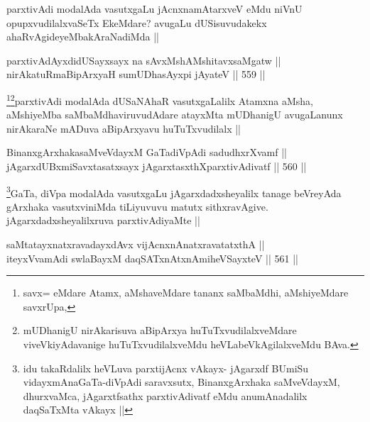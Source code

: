 \begin{artha}
parxtivAdi modalAda vasutxgaLu jAcnxnamAtarxveV eMdu niVnU opupxvudilalxvaSeTx EkeMdare? avugaLu dUSisuvudakekx ahaRvAgideyeMbakAraNadiMda ||
\end{artha}


\begin{shl}
parxtivAdAyxdidUSayxsayx na sAvxMshAMshitavxsaMgatw || \\
nirAkatuRmaBipArxyaH sumUDhasAyxpi jAyateV ||  559 ||  
\end{shl}

\begin{artha}
\footnote{savx= eMdare Atamx, aMshaveMdare tananx saMbaMdhi, aMshiyeMdare savxrUpa,}\footnote{mUDhanigU nirAkarisuva aBipArxya huTuTxvudilalxveMdare viveVkiyAdavanige huTuTxvudilalxveMdu heVLabeVkAgilalxveMdu BAva.}parxtivAdi modalAda dUSaNAhaR vasutxgaLalilx Atamxna aMsha, aMshiyeMba saMbaMdhaviruvudAdare atayxMta mUDhanigU avugaLanunx nirAkaraNe mADuva aBipArxyavu huTuTxvudilalx ||
\end{artha}


\begin{shl}
BinanxgArxhakasaMveVdayxM GaTadiVpAdi sadudhxrXvamf || \\
jAgarxdUBxmiSavxtasatxsayx jAgarxtasxthXparxtivAdivatf ||  560 ||  
\end{shl}

\begin{artha}
\footnote{idu takaRdalilx heVLuva parxtijAcnx vAkayx- jAgarxdf BUmiSu vidayxmAnaGaTa-diVpAdi saravxsutx, BinanxgArxhaka saMveVdayxM, dhurxvaMca, jAgarxtfsathx parxtivAdivatf eMdu anumAnadalilx daqSaTxMta vAkayx ||}GaTa, diVpa modalAda vasutxgaLu jAgarxdadxsheyalilx tanage beVreyAda gArxhaka vasutxviniMda tiLiyuvuvu matutx sithxravAgive. jAgarxdadxsheyalilxruva parxtivAdiyaMte ||
\end{artha}

\begin{shl}
saMtatayxnatxravadayxdAvx vijAcnxnAnatxravatatxthA || \\
iteyxVvamAdi swlaBayxM daqSATxnAtxnAmiheVSayxteV ||  561 ||  
\end{shl}

